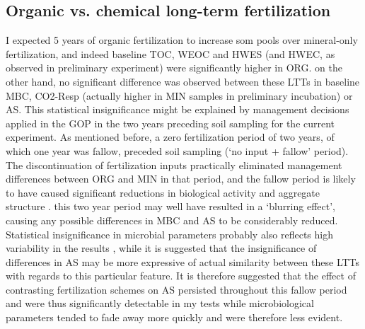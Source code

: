 \documentclass[12pt]{report}
\begin{document}
		\subsection{Organic vs. chemical long-term fertilization}
		I expected 5 years of organic fertilization to increase \gls{som} pools over mineral-only fertilization, and indeed baseline TOC, WEOC and HWES (and HWEC, as observed in preliminary experiment) were significantly higher in ORG. on the other hand, no significant difference was observed between these LTTs in baseline MBC, CO2-Resp (actually higher in MIN samples in preliminary incubation) or AS. This statistical insignificance might be explained by management decisions applied in the GOP in the two years preceding soil sampling for the current experiment. As mentioned before, a zero fertilization period of two years, of which one year was fallow, preceded soil sampling (‘no input + fallow' period). The discontinuation of fertilization inputs practically eliminated management differences between ORG and MIN in that period, and the fallow period is likely to have caused significant reductions in biological activity and aggregate structure \citep{redmile-gordon2020, golchin1994}. this two year period may well have resulted in a ‘blurring effect’, causing any possible differences in MBC and AS to be considerably reduced.
		Statistical insignificance in microbial parameters probably also reflects high variability in the results , while it is suggested that the insignificance of differences in AS may be more expressive of actual similarity between these LTTs with regards to this particular feature.
		It is therefore suggested that the effect of contrasting fertilization schemes on AS persisted throughout this fallow period and were thus significantly detectable  in my tests while microbiological parameters tended to fade away more quickly and were therefore less evident.
		
\end{document}
